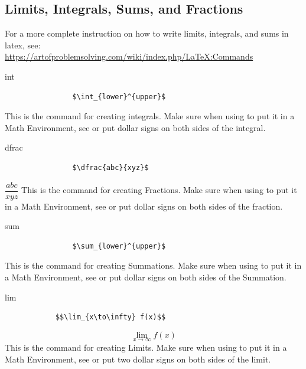 \documentclass[12pt,hidelinks]{article}
\begin{document}
	\subsection{Limits, Integrals, Sums, and Fractions}
		For a more complete instruction on how to write limits, integrals, and sums in latex, see:\\
		\url{https://artofproblemsolving.com/wiki/index.php/LaTeX:Commands}
		\begin{docCommand}{int}{}
			\begin{verbatim}
				$\int_{lower}^{upper}$
			\end{verbatim}
			This is the command for creating integrals. Make sure when using to put it in a Math Environment, see  or put dollar signs on both sides of the integral.
		\end{docCommand}
		\begin{docCommand}{dfrac}{}{}
			\begin{verbatim}
				$\dfrac{abc}{xyz}$
			\end{verbatim}
			$\dfrac{abc}{xyz}$
			This is the command for creating Fractions. Make sure when using to put it in a Math Environment, see  or put dollar signs on both sides of the fraction.
		\end{docCommand}
		\begin{docCommand}{sum}{}
			\begin{verbatim}
				$\sum_{lower}^{upper}$
			\end{verbatim}
			This is the command for creating Summations. Make sure when using to put it in a Math Environment, see  or put dollar signs on both sides of the Summation.
		\end{docCommand}	
		\begin{docCommand}{lim}{}
			\begin{verbatim}
			$$\lim_{x\to\infty} f(x)$$
			\end{verbatim}
			$$\lim_{x\to\infty} f(x)$$
			This is the command for creating Limits. Make sure when using to put it in a Math Environment, see  or put two dollar signs on both sides of the limit.
		\end{docCommand}	
\end{document}
